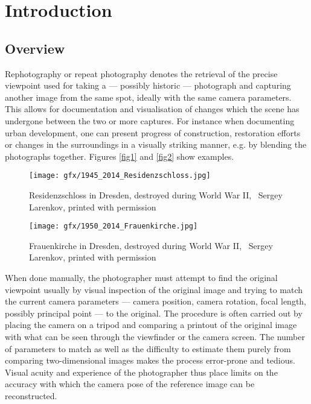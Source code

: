 \chapter{Introduction}

\section{Overview}

Rephotography or repeat photography denotes the retrieval of the precise viewpoint used for taking a
--- possibly historic --- photograph and capturing another image from the same
spot, ideally with the same camera parameters. This allows for documentation and
visualisation of changes which the scene has undergone between the two or more
captures.  For instance when documenting urban development, one can present
progress of construction, restoration efforts or changes in the surroundings in
a visually striking manner, e.g. by blending the photographs together.
Figures \autoref{fig1} and \autoref{fig2} show examples.

\begin{figure}
   \texttt{[image: gfx/1945\_2014\_Residenzschloss.jpg]}
   \caption{Residenzschloss in Dresden, destroyed during World War II,
   \textcopyright\ Sergey Larenkov, printed with permission}
   \label{fig1}
\end{figure}

\begin{figure}
   \texttt{[image: gfx/1950\_2014\_Frauenkirche.jpg]}
   \caption{Frauenkirche in Dresden, destroyed during World War II,
   \textcopyright\ Sergey Larenkov, printed with permission}
   \label{fig2}
\end{figure}

When done manually, the photographer must attempt to find the original viewpoint 
usually by visual inspection of the original image and trying to match the
current camera parameters --- camera position, camera rotation, focal length,
possibly principal point --- to the original.
The procedure is often carried out by placing the camera on a tripod and
comparing a printout of the original image with what can be seen through the
viewfinder or the camera screen. The number of parameters to match as well as
the difficulty to estimate them purely from comparing two-dimensional images makes the process
error-prone and tedious. Visual acuity and experience of the photographer thus
place limits on the accuracy with which the camera pose of the reference image
can be reconstructed. 

